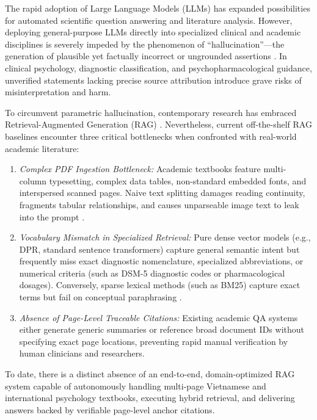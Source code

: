\documentclass[10pt]{SPIIRAS_Proceedings}
\begin{document}
The rapid adoption of Large Language Models (LLMs) has expanded possibilities for automated scientific question answering and literature analysis. However, deploying general-purpose LLMs directly into specialized clinical and academic disciplines is severely impeded by the phenomenon of ``hallucination''---the generation of plausible yet factually incorrect or ungrounded assertions \cite{min2023factscore, lu2026mhb}. In clinical psychology, diagnostic classification, and psychopharmacological guidance, unverified statements lacking precise source attribution introduce grave risks of misinterpretation and harm.

To circumvent parametric hallucination, contemporary research has embraced Retrieval-Augmented Generation (RAG) \cite{lewis2020retrieval}. Nevertheless, current off-the-shelf RAG baselines encounter three critical bottlenecks when confronted with real-world academic literature:
\begin{enumerate}
    \item \textit{Complex PDF Ingestion Bottleneck:} Academic textbooks feature multi-column typesetting, complex data tables, non-standard embedded fonts, and interspersed scanned pages. Naive text splitting damages reading continuity, fragments tabular relationships, and causes unparseable image text to leak into the prompt \cite{elbachyr2024empirical, santos2026pdf}.
    \item \textit{Vocabulary Mismatch in Specialized Retrieval:} Pure dense vector models (e.g., DPR, standard sentence transformers) capture general semantic intent but frequently miss exact diagnostic nomenclature, specialized abbreviations, or numerical criteria (such as DSM-5 diagnostic codes or pharmacological dosages). Conversely, sparse lexical methods (such as BM25) capture exact terms but fail on conceptual paraphrasing \cite{karpukhin2020dense, formal2021splade}.
    \item \textit{Absence of Page-Level Traceable Citations:} Existing academic QA systems either generate generic summaries or reference broad document IDs without specifying exact page locations, preventing rapid manual verification by human clinicians and researchers.
\end{enumerate}
To date, there is a distinct absence of an end-to-end, domain-optimized RAG system capable of autonomously handling multi-page Vietnamese and international psychology textbooks, executing hybrid retrieval, and delivering answers backed by verifiable page-level anchor citations.
\end{document}

